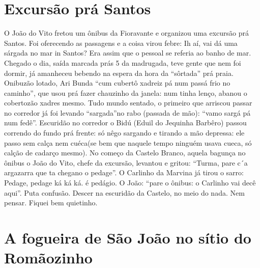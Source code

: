 \documentclass[12pt,brazil,]{book}
\begin{document}
\section{Excursão prá Santos}\label{excursuxe3o-pruxe1-santos}

O João do Vito fretou um ônibus da Fioravante e organizou uma excursão
prá Santos. Foi oferecendo as passagens e a coisa virou febre: Ih aí,
vai dá uma sárgada no mar in Santos? Era assim que o pessoal se referia
ao banho de mar. Chegado o dia, saída marcada prás 5 da madrugada, teve
gente que nem foi dormir, já amanheceu bebendo na espera da hora da
``sôrtada'' prá praia. Onibuzão lotado, Ari Bunda ``cum cubertô xadreiz
pá num passá frio no caminho'', que usou prá fazer chauzinho da janela:
num tinha lenço, abanou o cobertozão xadres mesmo. Tudo mundo sentado, o
primeiro que arriscou passar no corredor já foi levando ``sargada''no
rabo (passada de mão): ``vamo sargá pá num fedê''. Escuridão no corredor
o Bidú (Eduil do Jequinha Barbêro) passou correndo do fundo prá frente:
só nêgo sargando e tirando a mão depressa: ele passo sem calça nem
cuéca(se bem que naquele tempo ninguém usava cueca, só calção de cadarço
mesmo). No começo da Castelo Branco, aquela bagunça no ônibus o João do
Vito, chefe da excursão, levantou e gritou: ``Turma, pare c´a argazarra
que ta chegano o pedage''. O Carlinho da Marvina já tirou o sarro:
Pedage, pedage ká ká ká. é pedágio. O João: ``pare o ônibus: o Carlinho
vai decê aqui''. Puta confusão. Descer na escuridão da Castelo, no meio
do nada. Nem pensar. Fiquei bem quietinho.

\section{A fogueira de São João no sítio do
Romãozinho}\label{a-fogueira-de-suxe3o-jouxe3o-no-suxedtio-do-romuxe3ozinho}
\end{document}
